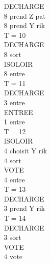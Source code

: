 \documentclass[12pt]{article} %
\begin{document}
\begin{multicols}{3}
{			\hspace*{5mm} DECHARGE\\
			\hspace*{12mm} 8 prend Z pat\\
			\hspace*{12mm} 8 prend Y rik\\
			T = 10\\
			\hspace*{5mm} DECHARGE\\
			\hspace*{12mm} 8 sort\\
			\hspace*{5mm} ISOLOIR\\
			\hspace*{12mm} 8 entre\\
			T = 11\\
			\hspace*{5mm} DECHARGE\\
			\hspace*{12mm} 3 entre\\
			\hspace*{5mm} ENTREE\\
			\hspace*{12mm} 1 entre\\
			T = 12\\
			\hspace*{5mm} ISOLOIR\\
			\hspace*{12mm} 4 choisit Y rik\\
			\hspace*{12mm} 4 sort\\
			\hspace*{5mm} VOTE\\
			\hspace*{12mm} 4 entre\\
			T = 13\\
			\hspace*{5mm} DECHARGE\\
			\hspace*{12mm} 3 prend Y rik\\
			T = 14\\
			\hspace*{5mm} DECHARGE\\
			\hspace*{12mm} 3 sort\\
			\hspace*{5mm} VOTE\\
			\hspace*{12mm} 4 vote\\
}
\end{multicols}
\end{document}
